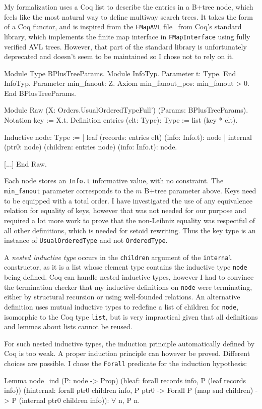 \documentclass[11pt]{article}
\def\coqe{\lstinline[language=Coq, basicstyle=\small]}
\begin{document}
My formalization uses a Coq list to describe the entries in a B+tree node, which feels like the most natural way to define multiway search trees.
It takes the form of a Coq functor, and is inspired from the \coqe{FMapAVL} file~\cite{CSTDLAVL} from Coq's standard library,
which implements the finite map interface in \coqe{FMapInterface} using fully verified AVL trees.
However, that part of the standard library is unfortunately deprecated and doesn't seem to be maintained so I chose not to rely on it.

\begin{coq}
Module Type BPlusTreeParams.
  Module InfoTyp.
    Parameter t: Type.
  End InfoTyp.
  Parameter min_fanout: Z.
  Axiom min_fanout_pos: min_fanout > 0.
End BPlusTreeParams.

Module Raw (X: Orders.UsualOrderedTypeFull') (Params: BPlusTreeParams).
  Notation key := X.t.
  Definition entries (elt: Type): Type := list (key * elt).
  
  Inductive node: Type :=
  | leaf (records: entries elt) (info: Info.t): node
  | internal (ptr0: node) (children: entries node) (info: Info.t): node.

  [...]
End Raw.
\end{coq}

Each node stores an \coqe{Info.t} informative value, with no constraint.
The \coqe{min_fanout} parameter corresponds to the $m$ B+tree parameter above.
Keys need to be equipped with a total order.
I have investigated the use of any equivalence relation for equality of keys,
however that was not needed for our purpose and required a lot more work to prove that the non-Leibniz equality was respectful of all other definitions, which is needed for setoid rewriting.
Thus the key type is an instance of \coqe{UsualOrderedType} and not \coqe{OrderedType}.

A \emph{nested inductive type} occurs in the \coqe{children} argument of the \coqe{internal} constructor, as it is a list whose element type contains the inductive type \coqe{node} being defined.
Coq can handle nested inductive types, however I had to convince the termination checker that my inductive definitions on \coqe{node} were terminating, either by structural recursion or using well-founded relations.
An alternative definition uses mutual inductive types to redefine a list of children for \coqe{node}, isomorphic to the Coq type \coqe{list}, but is very impractical given that all definitions and lemmas about lists cannot be reused.

For such nested inductive types, the induction principle automatically defined by Coq is too weak. A proper induction principle can however be proved.
Different choices are possible. I chose the \coqe{Forall} predicate for the induction hypothesis:
\begin{coq}
Lemma node_ind (P: node -> Prop)
  (hleaf: forall records info, P (leaf records info))
  (hinternal: forall ptr0 children info,
      P ptr0 -> Forall P (map snd children) -> P (internal ptr0 children info)):
$\forall$ n, P n.
\end{coq}
\end{document}
